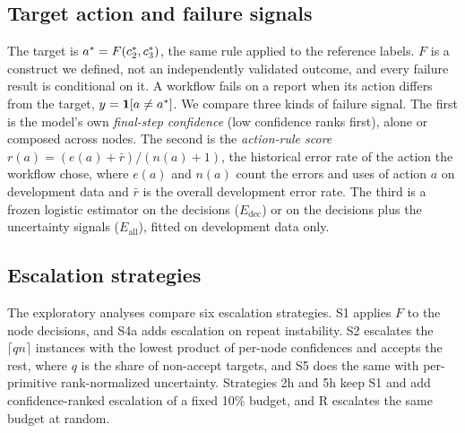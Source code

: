 \subsection{Target action and failure signals}
The target is $a^{*} = F(c_2^{*}, c_3^{*})$, the same rule applied to
the reference labels. $F$ is a construct we defined, not an
independently validated outcome, and every failure result is conditional
on it. A workflow fails on a report when its action differs from the
target, $y = \mathbf{1}[a \neq a^{*}]$. We compare three kinds of
failure signal. The first is the model's own \emph{final-step
confidence} (low confidence ranks first), alone or composed across
nodes. The second is the \emph{action-rule score}
$r(a) = (e(a) + \bar r)/(n(a) + 1)$, the historical error rate of the
action the workflow chose, where $e(a)$ and $n(a)$ count the errors and
uses of action $a$ on development data and $\bar r$ is the overall
development error rate. The third is a frozen logistic estimator on the
decisions ($E_{\text{dec}}$) or on the decisions plus the uncertainty
signals ($E_{\text{all}}$), fitted on development data only.

\subsection{Escalation strategies}
The exploratory analyses compare six escalation strategies. S1 applies
$F$ to the node decisions, and S4a adds escalation on repeat
instability. S2 escalates the $\lceil qn\rceil$ instances with the
lowest product of per-node confidences and accepts the rest, where $q$
is the share of non-accept targets, and S5 does the same with
per-primitive rank-normalized uncertainty. Strategies 2h and 5h keep S1
and add confidence-ranked escalation of a fixed 10\% budget, and R
escalates the same budget at random.

